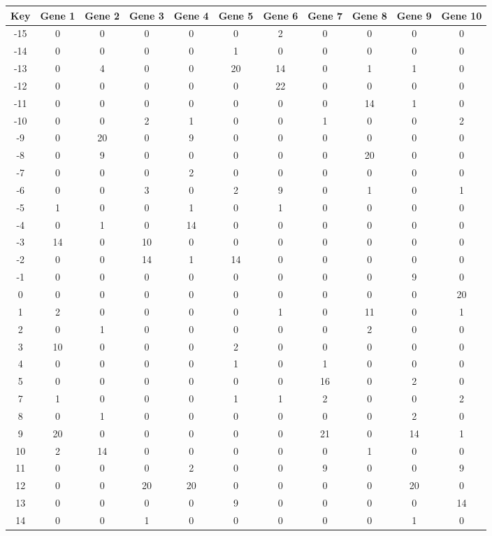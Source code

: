 \begin{tabular}{|c|c|c|c|c|c|c|c|c|c|c|}
\hline
Key & Gene 1 & Gene 2 & Gene 3 & Gene 4 & Gene 5 & Gene 6 & Gene 7 & Gene 8 & Gene 9 & Gene 10 \\
\hline
-15 & 0 & 0 & 0 & 0 & 0 & 2 & 0 & 0 & 0 & 0 \\
-14 & 0 & 0 & 0 & 0 & 1 & 0 & 0 & 0 & 0 & 0 \\
-13 & 0 & 4 & 0 & 0 & 20 & 14 & 0 & 1 & 1 & 0 \\
-12 & 0 & 0 & 0 & 0 & 0 & 22 & 0 & 0 & 0 & 0 \\
-11 & 0 & 0 & 0 & 0 & 0 & 0 & 0 & 14 & 1 & 0 \\
-10 & 0 & 0 & 2 & 1 & 0 & 0 & 1 & 0 & 0 & 2 \\
-9 & 0 & 20 & 0 & 9 & 0 & 0 & 0 & 0 & 0 & 0 \\
-8 & 0 & 9 & 0 & 0 & 0 & 0 & 0 & 20 & 0 & 0 \\
-7 & 0 & 0 & 0 & 2 & 0 & 0 & 0 & 0 & 0 & 0 \\
-6 & 0 & 0 & 3 & 0 & 2 & 9 & 0 & 1 & 0 & 1 \\
-5 & 1 & 0 & 0 & 1 & 0 & 1 & 0 & 0 & 0 & 0 \\
-4 & 0 & 1 & 0 & 14 & 0 & 0 & 0 & 0 & 0 & 0 \\
-3 & 14 & 0 & 10 & 0 & 0 & 0 & 0 & 0 & 0 & 0 \\
-2 & 0 & 0 & 14 & 1 & 14 & 0 & 0 & 0 & 0 & 0 \\
-1 & 0 & 0 & 0 & 0 & 0 & 0 & 0 & 0 & 9 & 0 \\
0 & 0 & 0 & 0 & 0 & 0 & 0 & 0 & 0 & 0 & 20 \\
1 & 2 & 0 & 0 & 0 & 0 & 1 & 0 & 11 & 0 & 1 \\
2 & 0 & 1 & 0 & 0 & 0 & 0 & 0 & 2 & 0 & 0 \\
3 & 10 & 0 & 0 & 0 & 2 & 0 & 0 & 0 & 0 & 0 \\
4 & 0 & 0 & 0 & 0 & 1 & 0 & 1 & 0 & 0 & 0 \\
5 & 0 & 0 & 0 & 0 & 0 & 0 & 16 & 0 & 2 & 0 \\
7 & 1 & 0 & 0 & 0 & 1 & 1 & 2 & 0 & 0 & 2 \\
8 & 0 & 1 & 0 & 0 & 0 & 0 & 0 & 0 & 2 & 0 \\
9 & 20 & 0 & 0 & 0 & 0 & 0 & 21 & 0 & 14 & 1 \\
10 & 2 & 14 & 0 & 0 & 0 & 0 & 0 & 1 & 0 & 0 \\
11 & 0 & 0 & 0 & 2 & 0 & 0 & 9 & 0 & 0 & 9 \\
12 & 0 & 0 & 20 & 20 & 0 & 0 & 0 & 0 & 20 & 0 \\
13 & 0 & 0 & 0 & 0 & 9 & 0 & 0 & 0 & 0 & 14 \\
14 & 0 & 0 & 1 & 0 & 0 & 0 & 0 & 0 & 1 & 0 \\
\hline
\end{tabular}